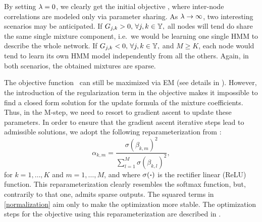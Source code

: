 By setting $\lambda=0$, we clearly get the initial objective , where inter-node correlations are modeled only via parameter sharing. As $\lambda \to \infty$, two interesting scenarios may be anticipated. If ${G}_{j,k} > 0, \, \forall j,k \in {\mathbb{Y}},$ all nodes will tend do share the same single mixture component, i.e.\ we would be learning one single HMM to describe the whole network. If ${G}_{j,k} < 0, \, \forall j,k \in {\mathbb{Y}},$ and $M \geq K$, each node would tend to learn its own HMM model independently from all the others. Again, in both scenarios, the obtained mixtures are sparse.

The objective function~ can still be maximized via EM (see details in ). However, the introduction of the regularization term in the objective makes it impossible to find a closed form solution for the update formula of the mixture coefficients. Thus, in the M-step, we need to resort to gradient ascent to update these parameters. In order to ensure that the gradient ascent iterative steps lead to admissible solutions, we adopt the following reparameterization from \citet{Yang2018}:
\begin{equation}
\label{normalization}
\alpha_{k,m} = \frac{\sigma \left(\beta_{k,m} \right)^2}{\sum_{l=1}^M \sigma \left( \beta_{k,l} \right)^2}, 
\end{equation}
for $k = 1, \dots, K$ and $m = 1, \dots, M$, and where $\sigma(\boldsymbol{\cdot})$ is the rectifier linear (ReLU) function. This reparameterization clearly resembles the softmax function, but, contrarily to that one, admits sparse outputs. The squared terms in \eqref{normalization} aim only to make the optimization more stable. The optimization steps for the objective  using this reparameterization are described in .

